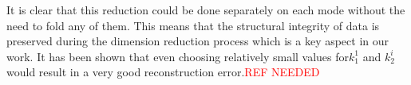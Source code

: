 \documentclass[preprint,12pt]{elsarticle}
\begin{document}
It is clear that this reduction could be done separately on each mode without the need to fold any of them. This means that the structural integrity of data is preserved during the dimension reduction process which is a key aspect in our work. It has been shown that even choosing relatively small values for$k_1^1$ and $k_2^i$ would result in a very good reconstruction error.\textcolor{red}{REF NEEDED} 
\end{document}
